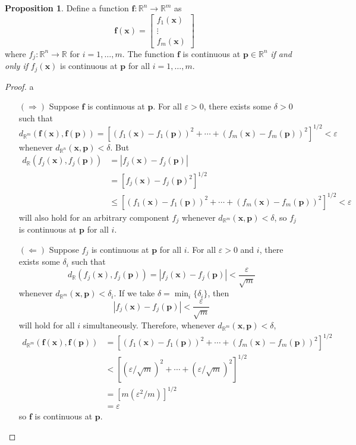 \documentclass{article}
\newcommand{\R}{\mathbb{R}}
\newcommand{\x}{\mathbf{x}}
\newcommand{\f}{\mathbf{f}}
\theoremstyle{definition}
\newtheorem{proposition}{Proposition}[section]
\begin{document}
\begin{proposition}
	Define a function $ \f:\R^n\to\R^m $ as 
	$$\f(\x)=\begin{bmatrix}
		f_1(\x)\\\vdots \\ f_m(\x)
	\end{bmatrix} $$ where $ f_j:\R^n\to\R $ for $ i=1,\ldots,m $. The function $ \f $ is continuous at $ \mathbf p \in \R^n$ \textit{if and only if} $ f_j(\x) $ is continuous at $ \mathbf p $ for all $ i=1,\ldots,m $. 
\end{proposition}
\begin{proof}{\color{white}a}
	\begin{enumerate}
		\item [$(\Longrightarrow)$] Suppose $ \f $ is continuous at $ \mathbf p $. For all $ \varepsilon>0 $, there exists some $ \delta > 0 $ such that $$ d_{\R^m}(\f(\x),\f(\mathbf p)) = \left[(f_1(\x) - f_1(\mathbf p))^2 + \cdots + (f_m(\x) - f_m(\mathbf p))^2\right]^{1/2}< \varepsilon$$ whenever $ d_{\R^n}(\x,\mathbf{p})<\delta $. But
		\begin{align*}
		d_{\R}(f_j(\x), f_j(\mathbf p))&=|f_j(\x)-f_j(\mathbf p)|\\& = [f_j(\x)-f_j(\mathbf p)^2]^{1/2}\\ &	\le \left[(f_1(\x) - f_1(\mathbf p))^2 + \cdots + (f_m(\x) - f_m(\mathbf p))^2\right]^{1/2}< \varepsilon
		\end{align*}
		will also hold for an arbitrary component  $ f_j $ whenever $ d_{\R^m}(\x,\mathbf{p})<\delta $, so $ f_j $ is continuous at $ \mathbf p $ for all $ i $. 
		\item [$(\Longleftarrow)$] Suppose $ f_j $ is continuous at $ \mathbf p $ for all $ i $. For all $ \varepsilon > 0 $ and $ i $, there exists some $ \delta_i  $ such that $$ d_\R(f_j(\x), f_j(\mathbf p)) = |f_j(\x)-f_j(\mathbf p)| < \frac{\varepsilon}{\sqrt{m}} $$ whenever $ d_{\R^m}(\x,\mathbf p)<\delta_i $. If we take $ \delta = \min_i\{\delta_i\} $, then $$|f_j(\x)-f_j(\mathbf p) | < \frac{\varepsilon}{\sqrt m}$$ will hold for all $ i $ simultaneously. Therefore, whenever $ d_{\R^m}(\x,\mathbf{p}) < \delta $, \begin{align*}
			d_{\R^m}(\f(\x),\f(\mathbf p)) & = \left[(f_1(\x) - f_1(\mathbf p))^2 + \cdots + (f_m(\x) - f_m(\mathbf p))^2\right]^{1/2} \\ & < \left[(\varepsilon/\sqrt{m})^2 + \cdots + (\varepsilon/\sqrt{m})^2\right]^{1/2} \\
			& = [m(\varepsilon^2/m)]^{1/2} \\
			& = \varepsilon
		\end{align*}
	so $ \f $ is continuous at $ \mathbf p $.
	\end{enumerate}

\end{proof}
\end{document}

